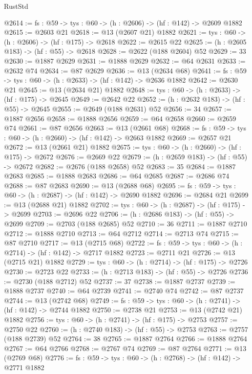 \begin{lexlean}{RustStd}
\begin{coremodule}
@2614 := {fs : @59} -> {tys : @60} -> (h : @2606) -> (hf : @142) -> @2609 @1882
@2615 := @2603 @21
@2618 := @13 (@2607 @21) @1882
@2621 := {tys : @60} -> (h : @2606) -> (hf : @175) -> @2618
@2622 := @2615 @22
@2625 := (h : @2605 @183) -> (hf : @55) -> @2618
@2628 := @2622 (@188 @2604) @52
@2629 := 33
@2630 := @1887 @2629
@2631 := @1888 @2629
@2632 := @64 @2631
@2633 := @2632 @74
@2634 := @87 @2629
@2636 := @13 (@2634 @68)
@2641 := {fs : @59} -> {tys : @60} -> (h : @2633) -> (hf : @142) -> @2636 @1882
@2642 := @2630 @21
@2645 := @13 (@2634 @21) @1882
@2648 := {tys : @60} -> (h : @2633) -> (hf : @175) -> @2645
@2649 := @2642 @22
@2652 := (h : @2632 @183) -> (hf : @55) -> @2645
@2655 := @2649 (@188 @2631) @52
@2656 := 34
@2657 := @1887 @2656
@2658 := @1888 @2656
@2659 := @64 @2658
@2660 := @2659 @74
@2661 := @87 @2656
@2663 := @13 (@2661 @68)
@2668 := {fs : @59} -> {tys : @60} -> (h : @2660) -> (hf : @142) -> @2663 @1882
@2669 := @2657 @21
@2672 := @13 (@2661 @21) @1882
@2675 := {tys : @60} -> (h : @2660) -> (hf : @175) -> @2672
@2676 := @2669 @22
@2679 := (h : @2659 @183) -> (hf : @55) -> @2672
@2682 := @2676 (@188 @2658) @52
@2683 := 35
@2684 := @1887 @2683
@2685 := @1888 @2683
@2686 := @64 @2685
@2687 := @2686 @74
@2688 := @87 @2683
@2690 := @13 (@2688 @68)
@2695 := {fs : @59} -> {tys : @60} -> (h : @2687) -> (hf : @142) -> @2690 @1882
@2696 := @2684 @21
@2699 := @13 (@2688 @21) @1882
@2702 := {tys : @60} -> (h : @2687) -> (hf : @175) -> @2699
@2703 := @2696 @22
@2706 := (h : @2686 @183) -> (hf : @55) -> @2699
@2709 := @2703 (@188 @2685) @52
@2710 := 36
@2711 := @1887 @2710
@2712 := @1888 @2710
@2713 := @64 @2712
@2714 := @2713 @74
@2715 := @87 @2710
@2717 := @13 (@2715 @68)
@2722 := {fs : @59} -> {tys : @60} -> (h : @2714) -> (hf : @142) -> @2717 @1882
@2723 := @2711 @21
@2726 := @13 (@2715 @21) @1882
@2729 := {tys : @60} -> (h : @2714) -> (hf : @175) -> @2726
@2730 := @2723 @22
@2733 := (h : @2713 @183) -> (hf : @55) -> @2726
@2736 := @2730 (@188 @2712) @52
@2737 := 37
@2738 := @1887 @2737
@2739 := @1888 @2737
@2740 := @64 @2739
@2741 := @2740 @74
@2742 := @87 @2737
@2744 := @13 (@2742 @68)
@2749 := {fs : @59} -> {tys : @60} -> (h : @2741) -> (hf : @142) -> @2744 @1882
@2750 := @2738 @21
@2753 := @13 (@2742 @21) @1882
@2756 := {tys : @60} -> (h : @2741) -> (hf : @175) -> @2753
@2757 := @2750 @22
@2760 := (h : @2740 @183) -> (hf : @55) -> @2753
@2763 := @2757 (@188 @2739) @52
@2764 := 38
@2765 := @1887 @2764
@2766 := @1888 @2764
@2767 := @64 @2766
@2768 := @2767 @74
@2769 := @87 @2764
@2771 := @13 (@2769 @68)
@2776 := {fs : @59} -> {tys : @60} -> (h : @2768) -> (hf : @142) -> @2771 @1882

\end{coremodule}
\end{lexlean}
